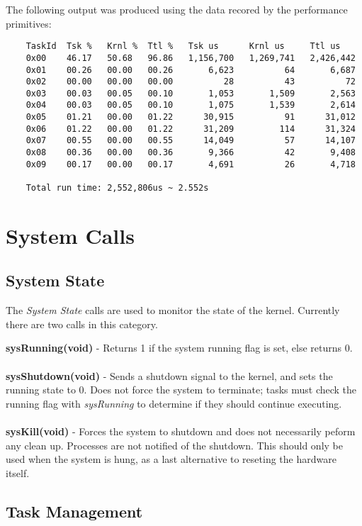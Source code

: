 \documentclass[twoside,a4paper]{refart}
\begin{document}
The following output was produced using the data recored by the performance primitives:
\begin{verbatim}
    TaskId  Tsk %   Krnl %  Ttl %   Tsk us      Krnl us     Ttl us
    0x00    46.17   50.68   96.86   1,156,700   1,269,741   2,426,442
    0x01    00.26   00.00   00.26       6,623          64       6,687
    0x02    00.00   00.00   00.00          28          43          72
    0x03    00.03   00.05   00.10       1,053       1,509       2,563
    0x04    00.03   00.05   00.10       1,075       1,539       2,614
    0x05    01.21   00.00   01.22      30,915          91      31,012
    0x06    01.22   00.00   01.22      31,209         114      31,324
    0x07    00.55   00.00   00.55      14,049          57      14,107
    0x08    00.36   00.00   00.36       9,366          42       9,408
    0x09    00.17   00.00   00.17       4,691          26       4,718

    Total run time: 2,552,806us ~ 2.552s
\end{verbatim}

\section{System Calls}
\subsection{System State}

The \textit{System State} calls are used to monitor the state of the kernel. Currently there are two calls in this category.

\textbf{sysRunning(void)} - Returns 1 if the system running flag is set, else returns 0.\\\\
\textbf{sysShutdown(void)} - Sends a shutdown signal to the kernel, and sets the running state to 0. Does not force the system to terminate; tasks must check the running flag with \textit{sysRunning} to determine if they should continue executing.\\\\
\textbf{sysKill(void)} - Forces the system to shutdown and does not necessarily peform any clean up. Processes are not notified of the shutdown. This should only be used when the system is hung, as a last alternative to reseting the hardware itself.

\subsection{Task Management}
\end{document}
